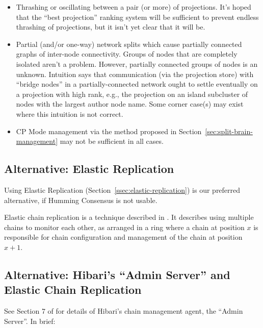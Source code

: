 \documentclass[preprint,10pt]{sigplanconf}
\begin{document}
\begin{itemize}

\item Thrashing or oscillating between a pair (or more) of
  projections.  It's hoped that the ``best projection'' ranking system
  will be sufficient to prevent endless thrashing of projections, but
  it isn't yet clear that it will be.

\item Partial (and/or one-way) network splits which cause partially
  connected graphs of inter-node connectivity.  Groups of nodes that
  are completely isolated aren't a problem.  However, partially
  connected groups of nodes is an unknown.  Intuition says that
  communication (via the projection store) with ``bridge nodes'' in a
  partially-connected network ought to settle eventually on a
  projection with high rank, e.g., the projection on an island
  subcluster of nodes with the largest author node name.  Some corner
  case(s) may exist where this intuition is not correct.

\item CP Mode management via the method proposed in
  Section~\ref{sec:split-brain-management} may not be sufficient in
  all cases.

\end{itemize}

\subsection{Alternative: Elastic Replication}

Using Elastic Replication (Section~\ref{ssec:elastic-replication}) is
our preferred alternative, if Humming Consensus is not usable.

Elastic chain replication is a technique described in
\cite{elastic-chain-replication}.  It describes using multiple chains
to monitor each other, as arranged in a ring where a chain at position
$x$ is responsible for chain configuration and management of the chain
at position $x+1$.

\subsection{Alternative: Hibari's ``Admin Server''
  and Elastic Chain Replication}

See Section 7 of \cite{cr-theory-and-practice} for details of Hibari's
chain management agent, the ``Admin Server''.  In brief:
\end{document}
